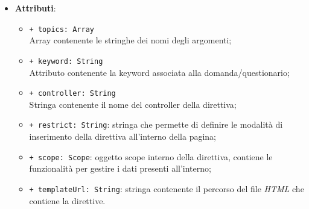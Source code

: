 \begin{itemize}
\begin{itemize}
	\end{itemize}
	\item \textbf{Attributi}:
	\begin{itemize}
		\item \texttt{+ topics: Array} \\ Array contenente le stringhe dei nomi degli argomenti;
		\item \texttt{+ keyword: String} \\ Attributo contenente la keyword associata alla domanda/questionario;
		\item \texttt{+ controller: String} \\ Stringa contenente il nome del controller della direttiva;
		\item \texttt{+ restrict: String}: stringa che permette di definire le modalità di inserimento della direttiva all'interno della pagina;
		\item \texttt{+ scope: Scope}: oggetto scope interno della direttiva, contiene le funzionalità per gestire i dati presenti all'interno;
		\item \texttt{+ templateUrl: String}: stringa contenente il percorso del file \textit{HTML} che contiene la direttive.
	\end{itemize}
\end{itemize}